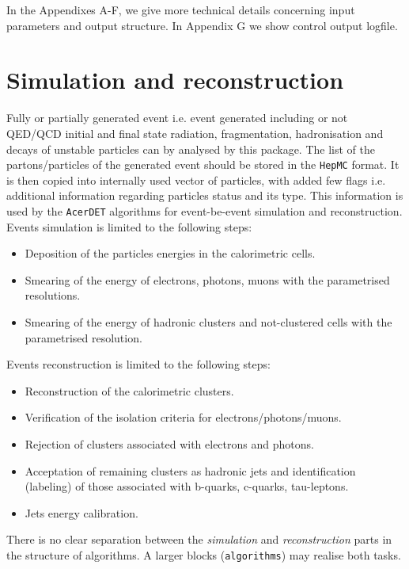 In the Appendixes A-F, we give more technical details concerning input parameters 
and output structure. In  Appendix G we show control output logfile.  
 

\boldmath
\section{Simulation and reconstruction}
\unboldmath

Fully or partially generated event i.e. event generated including 
or not QED/QCD initial and final state radiation, fragmentation,
hadronisation and decays of unstable particles can by analysed by 
this package. The list of the partons/particles of the generated event should
be stored in the {\tt HepMC} format. It is then copied into internally used 
vector of particles, with added few flags  i.e. additional information regarding
particles status and its type. This information is used by the {\tt AcerDET} algorithms 
for event-be-event simulation and reconstruction.\\
Events simulation is limited to the following steps:
\begin{itemize}
\item
Deposition of the particles energies in the calorimetric cells.
\item
Smearing of the energy of electrons, photons, muons with the parametrised
resolutions.
\item
Smearing of the energy of hadronic clusters and not-clustered cells
with the parametrised resolution.
\end{itemize}
Events reconstruction is limited to the following steps:
\begin{itemize}
\item
Reconstruction of the calorimetric clusters.
\item
Verification of the isolation criteria for electrons/photons/muons.
\item
Rejection of clusters associated with electrons and photons.
\item
Acceptation of remaining clusters as hadronic jets and identification
 (labeling)  of those associated with b-quarks, c-quarks, tau-leptons.
\item 
Jets energy calibration.
\end{itemize}
There is no clear separation between the {\it simulation} and {\it
reconstruction} parts in the structure of algorithms. A larger
blocks ({\tt algorithms}) may realise both tasks.

